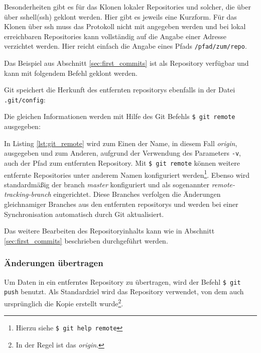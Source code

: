 
Besonderheiten gibt es für das Klonen lokaler Repositories und solcher, die über
über \gls{sshell}(\acrshort{ssh}) geklont werden. Hier gibt es jeweils eine
Kurzform. Für das Klonen über \acrshort{ssh} muss das Protokoll nicht mit
angegeben werden und bei lokal erreichbaren Repositories kann vollständig auf
die Angabe einer Adresse verzichtet werden. Hier reicht einfach die Angabe
eines Pfads \texttt{/pfad/zum/repo}.

Das Beispiel aus Abschnitt \ref{sec:first_commits} ist als
Repository verfügbar und kann mit folgendem Befehl geklont werden.


Git speichert die Herkunft des entfernten \glspl{repository} ebenfalls in der
Datei \texttt{.git/config}:


Die gleichen Informationen werden mit Hilfe des Git Befehls \texttt{\$ git
remote} ausgegeben:


In Listing \ref{lst:git_remote} wird zum Einen der Name, in diesem Fall
\textit{origin}, ausgegeben und zum Anderen, aufgrund der Verwendung des
Parameters \texttt{-v}, auch der Pfad zum entfernten Repository. Mit \texttt{\$
git remote} können weitere entfernte Repositories unter anderem Namen
konfiguriert werden\footnote{Hierzu siehe \texttt{\$ git help remote}}. Ebenso
wird standardmäßig der \gls{branch} \textit{master} konfiguriert und als
sogenannter \textit{remote-tracking-branch} eingerichtet. Diese Branches verfolgen
die Änderungen gleichnamiger Branches aus den entfernten \glspl{repository}
und werden bei einer Synchronisation automatisch durch Git
aktualisiert. \cite[S.~141-143]{gitosp}

Das weitere Bearbeiten des Repositoryinhalts kann wie in Abschnitt
\ref{sec:first_commits} beschrieben durchgeführt werden.

\subsubsection{Änderungen übertragen}\label{sec:pushchanges}
Um Daten in ein entferntes Repository zu übertragen, wird der Befehl \texttt{\$
git push} benutzt. Als Standardziel wird das Repository verwendet, von dem auch
ursprünglich die Kopie erstellt wurde\footnote{In der Regel ist das \textit{origin}.}.

